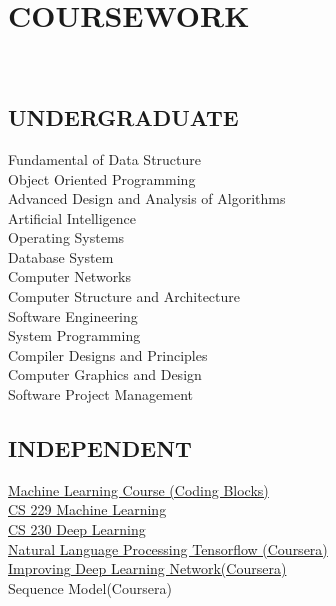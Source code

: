 \documentclass[a4paper]{deedy-resume-openfont}
\begin{document}
\begin{minipage}[t]{0.33\textwidth}

\section{COURSEWORK}
\quad \\
\subsection{UNDERGRADUATE}

Fundamental of Data Structure \\
Object Oriented Programming \\ 
Advanced Design and Analysis of Algorithms \\ 
Artificial Intelligence \\ 
Operating Systems \\ 
Database System \\ 
Computer Networks \\ 
Computer Structure and Architecture \\ 
Software Engineering\\
System Programming\\
Compiler Designs and Principles\\
Computer Graphics and Design\\
Software Project Management\\
\sectionsep

\subsection{INDEPENDENT}

\href{https://online.codingblocks.com/app/certificates/CBOL-26635-2848}{Machine Learning Course (Coding Blocks)} \\
\href{http://cs229.stanford.edu/}{CS 229 Machine Learning} \\
\href{https://cs230.stanford.edu/}{CS 230 Deep Learning} \\
\href{https://coursera.org/share/0d85004d7396f79556aa1a92de8a3ab5}{Natural Language Processing Tensorflow (Coursera)} \\
\href{https://coursera.org/share/bf38126b8c3094913923da5075b257d5}{Improving Deep Learning Network(Coursera)} \\
Sequence Model(Coursera) \\



\end{minipage}
\end{document}
